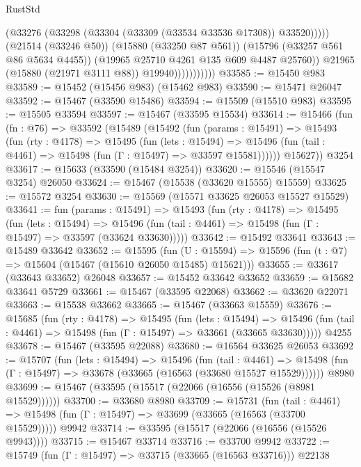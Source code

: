 \begin{lexlean}{RustStd}
\begin{coremodule}
                                (@33276 (@33298 (@33304 (@33309 (@33534 @33536 @17308)) @33520)))))
                            (@21514 (@33246 @50))
                            (@15880 (@33250 @87 @561))
                            (@15796 (@33257 @561 @86 @5634 @4455))
                            (@19965 @25710 @4261 @135 @609 @4487 @25760))
                          @21965
                          (@15880 (@21971 @3111 @88))
                          @19940)))))))))))
@33585 := @15450 @983
@33589 := @15452 (@15456 @983) (@15462 @983)
@33590 := @15471 @26047
@33592 := @15467 (@33590 @15486)
@33594 := @15509 (@15510 @983)
@33595 := @15505 @33594
@33597 := @15467 (@33595 @15534)
@33614 := @15466
    (fun (fn : @76) =>
    @33592
      (@15489
        (@15492
          (fun (params : @15491) =>
          @15493
            (fun (rty : @4178) =>
            @15495
              (fun (lets : @15494) =>
              @15496 (fun (tail : @4461) => @15498 (fun (Γ : @15497) => @33597 @15581))))))
        @15627))
    @3254
@33617 := @15633 (@33590 (@15484 @3254))
@33620 := @15546 (@15547 @3254) @26050
@33624 := @15467 (@15538 (@33620 @15555) @15559)
@33625 := @15572 @3254
@33630 := @15569 (@15571 @33625 @26053 @15527 @15529)
@33641 := fun (params : @15491) =>
  @15493
    (fun (rty : @4178) =>
    @15495
      (fun (lets : @15494) =>
      @15496 (fun (tail : @4461) => @15498 (fun (Γ : @15497) => @33597 (@33624 @33630)))))
@33642 := @15492 @33641
@33643 := @15489 @33642
@33652 := @15595
    (fun (U : @15594) => @15596 (fun (t : @7) => @15604 (@15467 (@15610 @26050 @15485) @15621)))
@33655 := @33617 (@33643 @33652) @26048
@33657 := @15452 @33642 @33652
@33659 := @15682 @33641 @5729
@33661 := @15467 (@33595 @22068)
@33662 := @33620 @22071
@33663 := @15538 @33662
@33665 := @15467 (@33663 @15559)
@33676 := @15685
    (fun (rty : @4178) =>
    @15495
      (fun (lets : @15494) =>
      @15496 (fun (tail : @4461) => @15498 (fun (Γ : @15497) => @33661 (@33665 @33630)))))
    @4255
@33678 := @15467 (@33595 @22088)
@33680 := @16564 @33625 @26053
@33692 := @15707
    (fun (lets : @15494) =>
    @15496
      (fun (tail : @4461) =>
      @15498 (fun (Γ : @15497) => @33678 (@33665 (@16563 (@33680 @15527 @15529))))))
    @8980
@33699 := @15467 (@33595 (@15517 (@22066 (@16556 (@15526 (@8981 @15529))))))
@33700 := @33680 @8980
@33709 := @15731
    (fun (tail : @4461) => @15498 (fun (Γ : @15497) => @33699 (@33665 (@16563 (@33700 @15529)))))
    @9942
@33714 := @33595 (@15517 (@22066 (@16556 (@15526 @9943))))
@33715 := @15467 @33714
@33716 := @33700 @9942
@33722 := @15749 (fun (Γ : @15497) => @33715 (@33665 (@16563 @33716))) @22138

\end{coremodule}
\end{lexlean}
